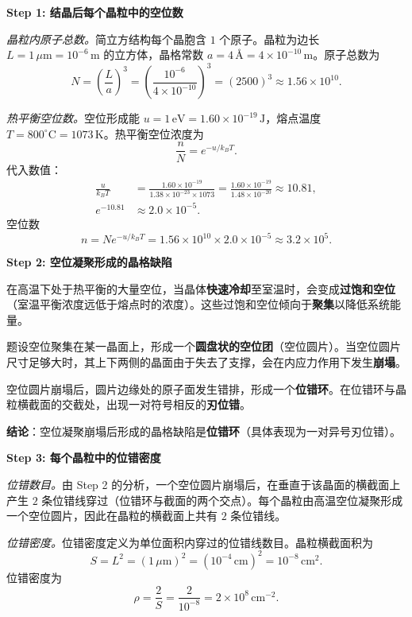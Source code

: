 \begin{derivationbox}[标准解题过程]
\textbf{Step 1: 结晶后每个晶粒中的空位数}

\textit{晶粒内原子总数。}简立方结构每个晶胞含 $1$ 个原子。晶粒为边长 $L=1\,\mu\mathrm{m}=10^{-6}\,\mathrm{m}$ 的立方体，晶格常数 $a=4\,\text{\AA}=4\times 10^{-10}\,\mathrm{m}$。原子总数为
\begin{equation}
N = \left(\frac{L}{a}\right)^{3}
= \left(\frac{10^{-6}}{4\times 10^{-10}}\right)^{3}
= (2500)^{3}
\approx 1.56\times 10^{10}.
\end{equation}

\textit{热平衡空位数。}空位形成能 $u=1\,\mathrm{eV}=1.60\times 10^{-19}\,\mathrm{J}$，熔点温度 $T=800^{\circ}\mathrm{C}=1073\,\mathrm{K}$。热平衡空位浓度为
\begin{equation}
\frac{n}{N} = e^{-u/k_{\!B}T}.
\end{equation}
代入数值：
\begin{align}
\frac{u}{k_{\!B}T} &= \frac{1.60\times 10^{-19}}{1.38\times 10^{-23}\times 1073}
= \frac{1.60\times 10^{-19}}{1.48\times 10^{-20}}
\approx 10.81,\\[4pt]
e^{-10.81} &\approx 2.0\times 10^{-5}.
\end{align}
空位数
\begin{equation}
n = N e^{-u/k_{\!B}T}
= 1.56\times 10^{10}\times 2.0\times 10^{-5}
\approx \boxed{3.2\times 10^{5}}.
\end{equation}

\textbf{Step 2: 空位凝聚形成的晶格缺陷}

在高温下处于热平衡的大量空位，当晶体\textbf{快速冷却}至室温时，会变成\textbf{过饱和空位}（室温平衡浓度远低于熔点时的浓度）。这些过饱和空位倾向于\textbf{聚集}以降低系统能量。

题设空位聚集在某一晶面上，形成一个\textbf{圆盘状的空位团}（空位圆片）。当空位圆片尺寸足够大时，其上下两侧的晶面由于失去了支撑，会在内应力作用下发生\textbf{崩塌}。

空位圆片崩塌后，圆片边缘处的原子面发生错排，形成一个\textbf{位错环}。在位错环与晶粒横截面的交截处，出现一对符号相反的\textbf{刃位错}。

\textbf{结论}：空位凝聚崩塌后形成的晶格缺陷是\textbf{位错环}（具体表现为一对异号刃位错）。

\textbf{Step 3: 每个晶粒中的位错密度}

\textit{位错数目。}由 Step 2 的分析，一个空位圆片崩塌后，在垂直于该晶面的横截面上产生 $2$ 条位错线穿过（位错环与截面的两个交点）。每个晶粒由高温空位凝聚形成一个空位圆片，因此在晶粒的横截面上共有 $2$ 条位错线。

\textit{位错密度。}位错密度定义为单位面积内穿过的位错线数目。晶粒横截面积为
\begin{equation}
S = L^{2} = (1\,\mu\mathrm{m})^{2} = (10^{-4}\,\mathrm{cm})^{2} = 10^{-8}\,\mathrm{cm^{2}}.
\end{equation}
位错密度为
\begin{equation}
\rho = \frac{2}{S} = \frac{2}{10^{-8}}
= \boxed{2\times 10^{8}\,\mathrm{cm^{-2}}}.
\end{equation}
\end{derivationbox}

